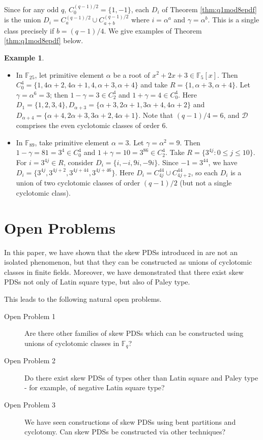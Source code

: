 \documentclass[12pt, a4paper]{article}
\theoremstyle{definition}
\newtheorem{example}[theorem]{Example}
\begin{document}
Since for any odd $q$, $C_0^{(q-1)/2}=\{1,-1\}$, each $D_i$ of Theorem \ref{thm:q1mod8epdf} is the union $D_i=C_a^{(q-1)/2} \cup C_{a+b}^{(q-1)/2}$ where $i=\alpha^a$ and $\gamma=\alpha^b$.  This is a single class precisely if $b=(q-1)/4$.
We give examples of Theorem \ref{thm:q1mod8epdf} below.
\begin{example}
\begin{itemize}
\item[(i)] In $\mathbb{F}_{25}$, let primitive element $\alpha$ be a root of $x^2+2x+3 \in \mathbb{F}_5[x]$.  Then $C_0^4=\{1,4\alpha+2,4\alpha+1,4,\alpha+3,\alpha+4\}$ and take $R=\{1,\alpha+3,\alpha+4\}$.  Let $\gamma=\alpha^6=3$; then $1-\gamma=3 \in C_2^4$ and $1+\gamma=4 \in C_0^4$. Here $D_1=\{1,2,3,4\}, D_{\alpha+3}=\{\alpha+3,2\alpha+1,3\alpha+4,4\alpha+2\}$ and $D_{\alpha+4}=\{\alpha+4,2\alpha+3,3\alpha+2,4\alpha+1\}$.  Note that $(q-1)/4=6$, and $\mathcal{D}$ comprises the even cyclotomic classes of order $6$.
\item[(ii)] In $\mathbb{F}_{89}$, take primitive element $\alpha=3$.
	Let $\gamma=\alpha^2=9$. Then
	$
	1-\gamma=81=3^4 \in C_0^4
	$ 
	and
	$
	1+\gamma=10=3^{86} \in C_2^4
	$.
	Take
	$
	R=\{3^{4j}:0\leq j\leq 10\}
	$. For $i=3^{4j}\in R$, consider
	$
	D_i=\{i,-i,9i,-9i\}.
	$ 
	Since $-1=3^{44}$, we have
	$D_i=\{3^{4j},3^{4j+2},3^{4j+44},3^{4j+46}\}$.  Here $D_i=C_{4j}^{44} \cup C_{4j+2}^{44}$, so each $D_i$ is a union of two cyclotomic classes of order $(q-1)/2$ (but not a single cyclotomic class). 
	\end{itemize}
\end{example}

\section{Open Problems}
In this paper, we have shown that the skew PDSs introduced in \cite{AnbKalMei} are not an isolated phenomenon, but that they can be constructed as unions of cyclotomic classes in finite fields.  Moreover, we have demonstrated that there exist skew PDSs not only of Latin square type, but also of Paley type.  

This leads to the following natural open problems.
\begin{description}
\item[Open Problem 1]  Are there other families of skew PDSs which can be constructed using unions of cyclotomic classes in $\mathbb{F}_q$?   

\item[Open Problem 2] Do there exist skew PDSs of types other than Latin square and Paley type - for example, of negative Latin square type?

\item[Open Problem 3] We have seen constructions of skew PDSs using bent partitions \cite{AnbKalMei} and cyclotomy.  Can skew PDSs be constructed via other techniques?
\end{description}
\end{document}
